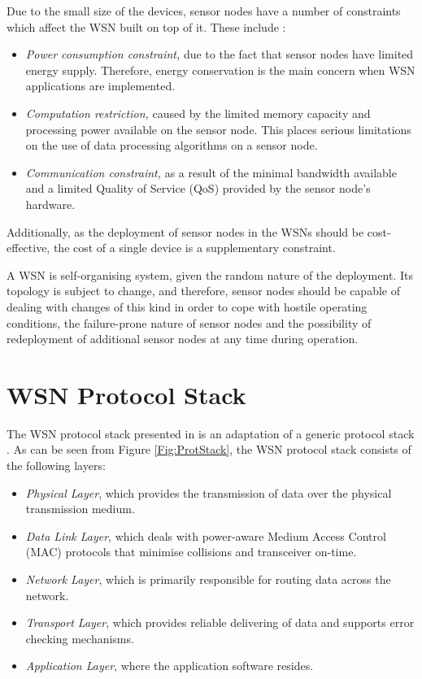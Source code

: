 Due to the small size of the devices, sensor nodes have a number of constraints
which affect the WSN built on top of it. These include \cite{yao:qps}:
\begin{itemize}
  \item \emph{Power consumption constraint,} due to the fact that sensor nodes
  have limited energy supply. Therefore, energy conservation is the main concern when
  WSN applications are implemented.
  \item \emph{Computation restriction,} caused by the limited memory
  capacity and processing power available on the sensor node. This places
  serious limitations on the use of data processing algorithms on a sensor node.
  
  \item \emph{Communication constraint,} as a result of the minimal bandwidth available and a
  limited Quality of Service (QoS) provided by the sensor node's hardware. 
\end{itemize}

Additionally, as the deployment of sensor nodes in the WSNs should be
cost-effective, the cost of a single device is a supplementary constraint.

A WSN is self-organising system, given the random nature of the deployment. Its
topology is subject to change, and therefore, sensor nodes should be capable of
dealing with changes of this kind in order to cope with hostile operating
conditions, the failure-prone nature of sensor nodes and the possibility of
redeployment of additional sensor nodes at any time during operation.

\section{WSN Protocol Stack} \label{sec:WSNProtStack}

The WSN protocol stack presented in \cite{SensorSurveyAkyildiz:2002} is an
adaptation of a generic protocol stack \cite{ComputerNetworksTannenbaum:2003}. As
can be seen from Figure \ref{Fig:ProtStack}, the WSN protocol stack consists of
the following layers:

\begin{itemize}
\item \emph{Physical Layer}, which provides the transmission of data over the physical transmission medium.
\item \emph{Data Link Layer}, which deals with power-aware Medium Access Control (MAC) protocols that minimise collisions and transceiver on-time.
\item \emph{Network Layer}, which is primarily responsible for
routing data across the network.
\item \emph{Transport Layer}, which provides reliable delivering of data and
supports error checking mechanisms.
\item \emph{Application Layer}, where the application software resides.
\end{itemize}

